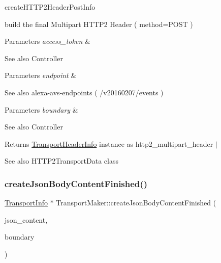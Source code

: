 create\+H\+T\+T\+P2\+Header\+Post\+Info 

build the final Multipart H\+T\+T\+P2 Header ( method=P\+O\+ST ) 
\begin{DoxyParams}{Parameters}
{\em access\+\_\+token} & \\
\hline
\end{DoxyParams}
\begin{DoxySeeAlso}{See also}
Controller 
\end{DoxySeeAlso}

\begin{DoxyParams}{Parameters}
{\em endpoint} & \\
\hline
\end{DoxyParams}
\begin{DoxySeeAlso}{See also}
alexa-\/avs-\/endpoints ( /v20160207/events ) 
\end{DoxySeeAlso}

\begin{DoxyParams}{Parameters}
{\em boundary} & \\
\hline
\end{DoxyParams}
\begin{DoxySeeAlso}{See also}
Controller 
\end{DoxySeeAlso}
\begin{DoxyReturn}{Returns}
\hyperlink{classAlexaEvent_1_1TransportHeaderInfo}{Transport\+Header\+Info} instance as http2\+\_\+multipart\+\_\+header $\vert$ 
\end{DoxyReturn}
\begin{DoxySeeAlso}{See also}
H\+T\+T\+P2\+Transport\+Data class 
\end{DoxySeeAlso}
\mbox{\label{classAlexaEvent_1_1TransportMaker_a8c54ff95e4a0687e6e6e19e80b11cecb}} 
\subsubsection{\texorpdfstring{create\+Json\+Body\+Content\+Finished()}{createJsonBodyContentFinished()}}
{\footnotesize\ttfamily \hyperlink{classAlexaEvent_1_1TransportInfo}{Transport\+Info} $\ast$ Transport\+Maker\+::create\+Json\+Body\+Content\+Finished (\begin{DoxyParamCaption}\item[{\hyperlink{classAlexaEvent_1_1TransportInfo}{Transport\+Info} $\ast$}]{json\+\_\+content,  }\item[{const char $\ast$}]{boundary }\end{DoxyParamCaption})}



